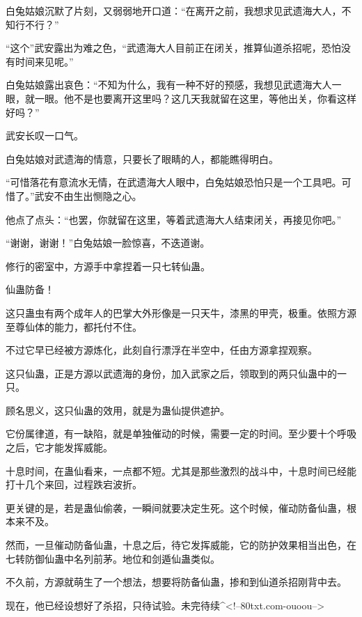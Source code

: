 \begin{this_body}
白兔姑娘沉默了片刻，又弱弱地开口道：“在离开之前，我想求见武遗海大人，不知行不行？”

“这个”武安露出为难之色，“武遗海大人目前正在闭关，推算仙道杀招呢，恐怕没有时间来见呢。”

白兔姑娘露出哀色：“不知为什么，我有一种不好的预感，我想见武遗海大人一眼，就一眼。他不是也要离开这里吗？这几天我就留在这里，等他出关，你看这样好吗？”

武安长叹一口气。

白兔姑娘对武遗海的情意，只要长了眼睛的人，都能瞧得明白。

“可惜落花有意流水无情，在武遗海大人眼中，白兔姑娘恐怕只是一个工具吧。可惜了。”武安不由生出恻隐之心。

他点了点头：“也罢，你就留在这里，等着武遗海大人结束闭关，再接见你吧。”

“谢谢，谢谢！”白兔姑娘一脸惊喜，不迭道谢。

修行的密室中，方源手中拿捏着一只七转仙蛊。

仙蛊防备！

这只蛊虫有两个成年人的巴掌大外形像是一只天牛，漆黑的甲壳，极重。依照方源至尊仙体的能力，都托付不住。

不过它早已经被方源炼化，此刻自行漂浮在半空中，任由方源拿捏观察。

这只仙蛊，正是方源以武遗海的身份，加入武家之后，领取到的两只仙蛊中的一只。

顾名思义，这只仙蛊的效用，就是为蛊仙提供遮护。

它份属律道，有一缺陷，就是单独催动的时候，需要一定的时间。至少要十个呼吸之后，它才能发挥威能。

十息时间，在蛊仙看来，一点都不短。尤其是那些激烈的战斗中，十息时间已经能打十几个来回，过程跌宕波折。

更关键的是，若是蛊仙偷袭，一瞬间就要决定生死。这个时候，催动防备仙蛊，根本来不及。

然而，一旦催动防备仙蛊，十息之后，待它发挥威能，它的防护效果相当出色，在七转防御仙蛊中名列前茅。地位和剑遁仙蛊类似。

不久前，方源就萌生了一个想法，想要将防备仙蛊，掺和到仙道杀招刚背中去。

现在，他已经设想好了杀招，只待试验。未完待续\^{}<!--80txt.com-ouoou-->

\end{this_body}


